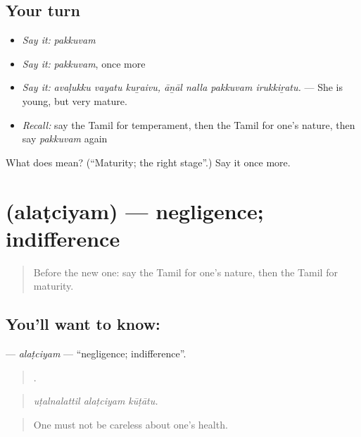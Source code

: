\subsection*{Your turn}
\begin{itemize}
\raggedright
  \item \emph{Say it:} \emph{pakkuvam}
  \item \emph{Say it:} \emph{pakkuvam}, once more
  \item \emph{Say it:} \emph{avaḷukku vayatu kuṟaivu, āṉāl nalla pakkuvam irukkiṟatu.} — She is young, but very mature.
  \item \emph{Recall:} say the Tamil for temperament, then the Tamil for one’s nature, then say \emph{pakkuvam} again
\end{itemize}

\begin{tcolorbox}[breakable,colback=teal!4,colframe=teal!35!black,title={Before you move on}]
What does  mean? (\textquotedblleft{}Maturity; the right stage\textquotedblright{}.) Say it once more.
\end{tcolorbox}
\section[\texorpdfstring{\ta{அலட்சியம்} (alaṭciyam)}{அலட்சியம் (alaṭciyam)}]{ (alaṭciyam) — negligence; indifference}

\label{lesson:TA-C471-alatciyam}



\begin{quote}
Before the new one: say the Tamil for one’s nature, then the Tamil for maturity.
\end{quote}

\subsection*{You'll want to know: }
\textbf{} — \emph{alaṭciyam} — \textquotedblleft{}negligence; indifference\textquotedblright{}.

\begin{quote}
  .
\end{quote}

\begin{quote}
\emph{uṭalnalattil alaṭciyam kūṭātu.}
\end{quote}

\begin{quote}
One must not be careless about one’s health.
\end{quote}

